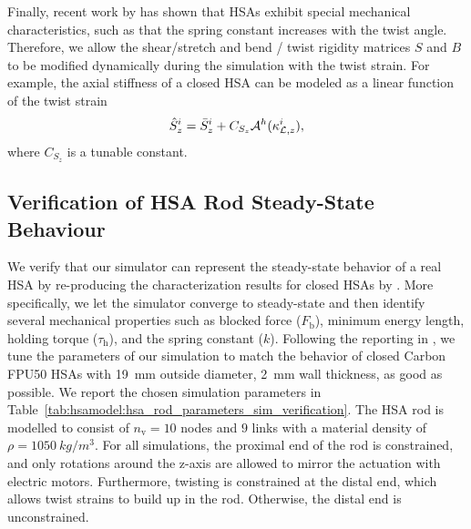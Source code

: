 Finally, recent work by \citet{good2022expanding} has shown that \glspl{HSA} exhibit special mechanical characteristics, such as that the spring constant increases with the twist angle. Therefore, we allow the shear/stretch and bend / twist rigidity matrices $S$ and $B$ to be modified dynamically during the simulation with the twist strain. For example, the axial stiffness of a closed \gls{HSA} can be modeled as a linear function of the twist strain~\citep{good2022expanding}
\begin{equation}
    \hat{S}_{z}^i = \Bar{S}_{z}^i + C_{S_z} \mathcal{A}^h(\kappa_{\mathcal{L},z}^i),
\end{equation}
where $C_{S_z}$ is a tunable constant.

\subsection{Verification of HSA Rod Steady-State Behaviour}\label{sub:hsamodel:hsa_robot_simulation:verification_good}
We verify that our simulator can represent the steady-state behavior of a real \gls{HSA} by re-producing the characterization results for closed \glspl{HSA} by \citet{good2022expanding}.
More specifically, we let the simulator converge to steady-state and then identify several mechanical properties such as blocked force ($F_\mathrm{b}$), minimum energy length, holding torque ($\tau_\mathrm{h}$), and the spring constant ($k$).
Following the reporting in \citep{good2022expanding}, we tune the parameters of our simulation to match the behavior of closed Carbon FPU50 \glspl{HSA} with \SI{19}{mm} outside diameter, \SI{2}{mm} wall thickness, as good as possible. We report the chosen simulation parameters in Table~\ref{tab:hsamodel:hsa_rod_parameters_sim_verification}. 
The \gls{HSA} rod is modelled to consist of $n_\mathrm{v} = 10$ nodes and $9$ links with a material density of $\rho = \SI{1050}{kg \per m^3}$. For all simulations, the proximal end of the rod is constrained, and only rotations around the z-axis are allowed to mirror the actuation with electric motors. Furthermore, twisting is constrained at the distal end, which allows twist strains to build up in the rod. Otherwise, the distal end is unconstrained.

